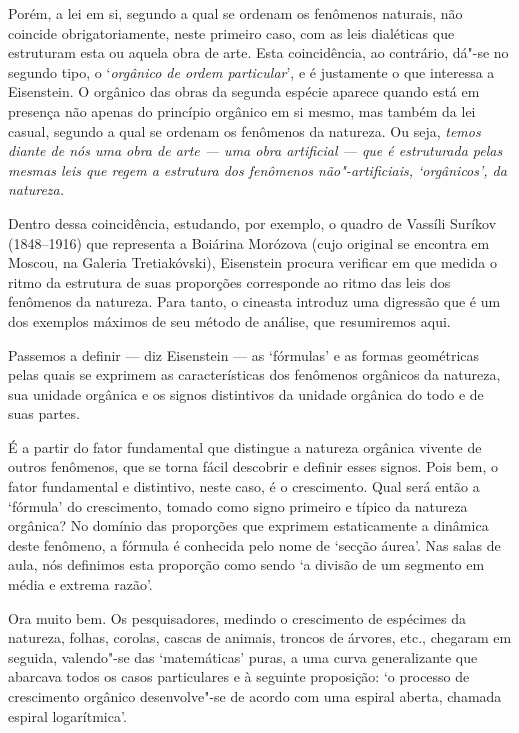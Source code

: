 Porém, a lei em si, segundo a qual se ordenam os fenômenos naturais, não
coincide obrigatoriamente, neste primeiro caso, com as leis dialéticas
que estruturam esta ou aquela obra de arte. Esta coincidência, ao
contrário, dá"-se no segundo tipo, o `\emph{orgânico de ordem
particular}', e é justamente o que interessa a Eisenstein. O orgânico
das obras da segunda espécie aparece quando está em presença não apenas
do princípio orgânico em si mesmo, mas também da lei casual, segundo a
qual se ordenam os fenômenos da natureza. Ou seja, \emph{temos diante
de nós uma obra de arte --- uma obra artificial --- que é estruturada
pelas mesmas leis que regem a estrutura dos fenômenos não"-artificiais,
`orgânicos', da natureza.}

Dentro dessa coincidência, estudando, por exemplo, o quadro de Vassíli
Suríkov (1848--1916) que representa a Boiárina Morózova (cujo original se
encontra em Moscou, na Galeria Tretiakóvski), Eisenstein procura
verificar em que medida o ritmo da estrutura de suas proporções
corresponde ao ritmo das leis dos fenômenos da natureza. Para tanto, o
cineasta introduz uma digressão que é um dos exemplos máximos de seu
método de análise, que resumiremos aqui.

Passemos a definir --- diz Eisenstein --- as `fórmulas' e as formas
geométricas pelas quais se exprimem as características dos fenômenos
orgânicos da natureza, sua unidade orgânica e os signos distintivos da
unidade orgânica do todo e de suas partes.

É a partir do fator fundamental que distingue a natureza orgânica
vivente de outros fenômenos, que se torna fácil descobrir e definir
esses signos. Pois bem, o fator fundamental e distintivo, neste caso, é
o crescimento. Qual será então a `fórmula' do crescimento, tomado como
signo primeiro e típico da natureza orgânica? No domínio das proporções
que exprimem estaticamente a dinâmica deste fenômeno, a fórmula é
conhecida pelo nome de `secção áurea'. Nas salas de aula, nós definimos
esta proporção como sendo `a divisão de um segmento em média e extrema
razão'.

Ora muito bem. Os pesquisadores, medindo o crescimento de espécimes da
natureza, folhas, corolas, cascas de animais, troncos de árvores, etc.,
chegaram em seguida, valendo"-se das `matemáticas' puras, a uma curva
generalizante que abarcava todos os casos particulares e à seguinte
proposição: `o processo de crescimento orgânico desenvolve"-se de acordo
com uma espiral aberta, chamada espiral logarítmica'.

